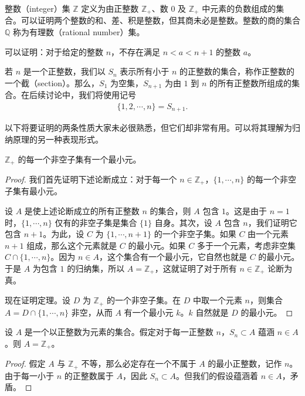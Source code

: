 \documentclass[../../main.tex]{subfiles}
\begin{document}
整数（integer）集 $\mathbb{Z}$ 定义为由正整数 $\mathbb{Z}_{+}$、数 $0$ 及 $\mathbb{Z}_{+}$ 中元素的负数组成的集合。可以证明两个整数的和、差、积是整数，但其商未必是整数。整数的商的集合 $\mathbb{Q}$ 称为有理数（rational number）集。

可以证明：对于给定的整数 $n$，不存在满足 $n < a < n + 1$ 的整数 $a$。

若 $n$ 是一个正整数，我们以 $S_{n}$ 表示所有小于 $n$ 的正整数的集合，称作正整数的一个截（section）。那么，$S_{1}$ 为空集，$S_{n+1}$ 为由 $1$ 到 $n$ 的所有正整数所组成的集合。在后续讨论中，我们将使用记号
\begin{align*}
\{1, 2, \cdots, n\} = S_{n+1}.
\end{align*}

以下将要证明的两条性质大家未必很熟悉，但它们却非常有用。可以将其理解为归纳原理的另一种表现形式。

\begin{theorem}[良序性质]\label{theorem:ch01-良序性质}
$\mathbb{Z}_{+}$ 的每一个非空子集有一个最小元。
\end{theorem}
\begin{proof}

我们首先证明下述论断成立：对于每一个 $n \in \mathbb{Z}_{+}$，$\{1, \cdots, n\}$ 的每一个非空子集有最小元。

设 $A$ 是使上述论断成立的所有正整数 $n$ 的集合，则 $A$ 包含 $1$。这是由于 $n = 1$ 时，$\{1, \cdots, n\}$ 仅有的非空子集是集合 $\{1\}$ 自身。其次，设 $A$ 包含 $n$，我们证明它包含 $n + 1$。为此，设 $C$ 为 $\{1, \cdots, n + 1\}$ 的一个非空子集。如果 $C$ 由一个元素 $n + 1$ 组成，那么这个元素就是 $C$ 的最小元。如果 $C$ 多于一个元素，考虑非空集 $C \cap \{1, \cdots, n\}$。因为 $n \in A$，这个集合有一个最小元，它自然也就是 $C$ 的最小元。于是 $A$ 为包含 $1$ 的归纳集，所以 $A = \mathbb{Z}_{+}$，这就证明了对于所有 $n \in \mathbb{Z}_{+}$ 论断为真。

现在证明定理。设 $D$ 为 $\mathbb{Z}_{+}$ 的一个非空子集。在 $D$ 中取一个元素 $n$，则集合 $A = D \cap \{1, \cdots, n\}$ 非空，从而 $A$ 有一个最小元 $k$。$k$ 自然就是 $D$ 的最小元。
\end{proof}

\begin{theorem}[强归纳原理]\label{theorem:ch01-强归纳}
设 $A$ 是一个以正整数为元素的集合。假定对于每一正整数 $n$，$S_{n} \subset A$ 蕴涵 $n \in A$。则 $A = \mathbb{Z}_{+}$。
\end{theorem}

\begin{proof}
假定 $A$ 与 $\mathbb{Z}_{+}$ 不等，那么必定存在一个不属于 $A$ 的最小正整数，记作 $n$。由于每一小于 $n$ 的正整数属于 $A$，因此 $S_{n} \subset A$。但我们的假设蕴涵着 $n \in A$，矛盾。
\end{proof}
\end{document}
